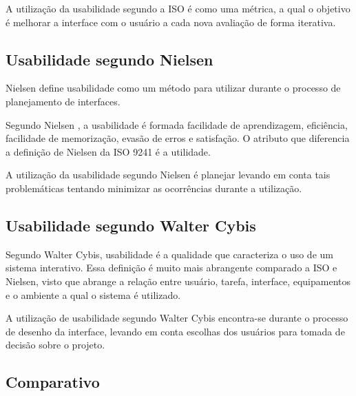 \documentclass[12pt]{article}
\begin{document}
A utilização da usabilidade segundo a ISO é como uma métrica, a qual o objetivo é melhorar a interface com o usuário a cada nova avaliação de forma iterativa.

\subsection{Usabilidade segundo Nielsen}

Nielsen define usabilidade como um método para utilizar durante o processo de planejamento de interfaces.

Segundo Nielsen \cite{nielsen1994usability}, a usabilidade é formada facilidade de aprendizagem, eficiência, facilidade de memorização, evasão de erros e satisfação. O atributo que diferencia a definição de Nielsen da ISO 9241 é a utilidade.

A utilização da usabilidade segundo Nielsen é planejar levando em conta tais problemáticas tentando minimizar as ocorrências durante a utilização.

\subsection{Usabilidade segundo Walter Cybis}

Segundo Walter Cybis\cite{de2015ergonomia}, usabilidade é a qualidade que caracteriza o uso de um sistema interativo. Essa definição é muito mais abrangente comparado a ISO e Nielsen, visto que abrange a relação entre usuário, tarefa, interface, equipamentos e o ambiente a qual o sistema é utilizado.

A utilização de usabilidade segundo Walter Cybis encontra-se durante o processo de desenho da interface, levando em conta escolhas dos usuários para tomada de decisão sobre o projeto.

\subsection{Comparativo}
\end{document}
